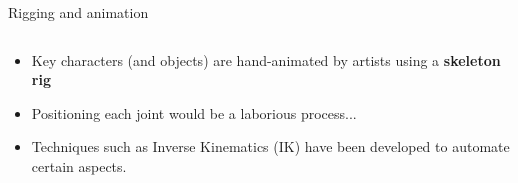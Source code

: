 \begin{frame}{Rigging and animation}
\begin{columns}
		\begin{column}{0.65\textwidth}
			\begin{itemize}
				\pause\item Key characters (and objects) are hand-animated by artists using a \textbf{skeleton rig}
				\pause\item Positioning each joint would be a laborious process...
				\pause\item Techniques such as Inverse Kinematics (IK) have been developed to automate certain aspects.
			\end{itemize}
		\end{column}
	\end{columns}
\end{frame}